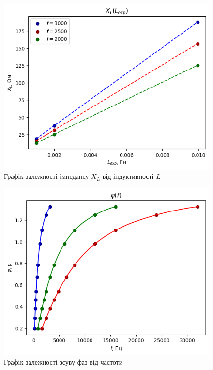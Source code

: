 \documentclass[a4paper,12pt]{article}
\begin{document}
\begin{justify}
    \begin{figure}[h!]
		\begin{center}
			\includegraphics[scale=0.8]{media/graph17}
		\end{center}
		\caption{Графік залежності імпедансу $X_L$ від індуктивності $L$}
		\label{Picture_2}
	\end{figure}\newpage
   
\begin{figure}[h!]
		\begin{center}
			\includegraphics[scale=0.8]{media/graph18}
		\end{center}
		\caption{Графік залежності зсуву фаз від частоти}
		\label{Picture_е}
	\end{figure}
	

\end{justify}
\end{document}
